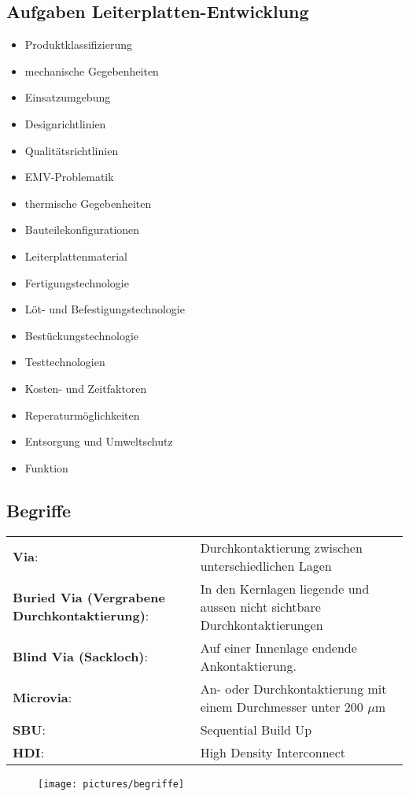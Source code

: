 \subsection{Aufgaben Leiterplatten-Entwicklung}
\begin{itemize}
  \item Produktklassifizierung
  \item mechanische Gegebenheiten
  \item Einsatzumgebung
  \item Designrichtlinien
  \item Qualitätsrichtlinien
  \item EMV-Problematik
  \item thermische Gegebenheiten
  \item Bauteilekonfigurationen
  \item Leiterplattenmaterial
  \item Fertigungstechnologie
  \item Löt- und
Befestigungstechnologie
\item Bestückungstechnologie
\item Testtechnologien
\item Kosten- und Zeitfaktoren
\item Reperaturmöglichkeiten
\item Entsorgung und Umweltschutz
\item Funktion
\end{itemize}

\subsection{Begriffe}
\begin{tabular}{p{6cm}p{11cm}}
\textbf{Via}:& Durchkontaktierung zwischen unterschiedlichen Lagen\\
\textbf{Buried Via (Vergrabene Durchkontaktierung)}: &In den Kernlagen liegende
  und aussen nicht sichtbare Durchkontaktierungen\\
\textbf{Blind Via (Sackloch)}: &Auf einer Innenlage endende Ankontaktierung.\\
\textbf{Microvia}: &An- oder Durchkontaktierung  mit einem Durchmesser unter 200
  $\mu$m\\
\textbf{SBU}:&Sequential Build Up\\
\textbf{HDI}:&High Density Interconnect\\
\end{tabular}
\begin{figure}[htb]
\texttt{[image: pictures/begriffe]}
\end{figure}

